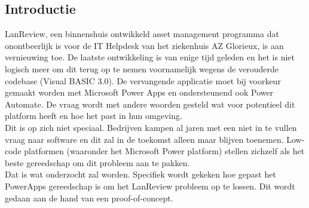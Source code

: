 \documentclass[a0,portrait]{a0poster}
\begin{document}
\begin{multicols}{2}
\color{HoGentAccent1} 
\section*{Introductie}
\color{black}
\color{black}
LanReview, een binnenshuis ontwikkeld asset management programma dat onontbeerlijk is voor de IT Helpdesk van het ziekenhuis AZ Glorieux, is aan vernieuwing toe. De laatste ontwikkeling is van enige tijd geleden en het is niet logisch meer om dit terug op te nemen voornamelijk wegens de verouderde codebase (Visual BASIC 3.0). De vervangende applicatie moet bij voorkeur gemaakt worden met Microsoft Power Apps en ondersteunend ook Power Automate. De vraag wordt met andere woorden gesteld wat voor potentieel dit platform heeft en hoe het past in hun omgeving.\\
Dit is op zich niet speciaal. Bedrijven kampen al jaren met een niet in te vullen vraag naar software en dit zal in de toekomst alleen maar blijven toenemen. Low-code platformen (waaronder het Microsoft Power platform) stellen zichzelf als het beste gereedschap om dit probleem aan te pakken.\\
Dat is wat onderzocht zal worden. Specifiek wordt gekeken hoe gepast het PowerApps gereedschap is om het LanReview probleem op te lossen. Dit wordt gedaan aan de hand van een proof-of-concept.



\color{Black} %
\color{HoGentAccent1} 

\end{multicols}
\end{document}

